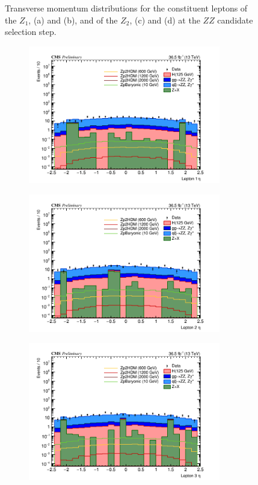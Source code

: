 \begin{enumerate}
\begin{figure}[tbh]
\begin{subfigure}{0.50\textwidth}
\caption{}
\end{subfigure}
\caption{Transverse momentum distributions for the constituent leptons of the $Z_1$, (a) and (b), and of the $Z_2$, (c) and (d) at the $ZZ$ candidate selection step.}
\label{fig:lep5kin1}
\end{figure}

\begin{figure}[tbh]
\begin{subfigure}{0.50\textwidth}
\centering
\includegraphics[width=3.3in]{figures/hist_hEtaLep1_5.png}
\caption{}
\end{subfigure}
\begin{subfigure}{0.50\textwidth}
\centering
\includegraphics[width=3.3in]{figures/hist_hEtaLep2_5.png}
\caption{}
\end{subfigure}
\begin{subfigure}{0.50\textwidth}
\centering
\includegraphics[width=3.3in]{figures/hist_hEtaLep3_5.png}

\end{subfigure}
\end{figure}
\end{enumerate}
